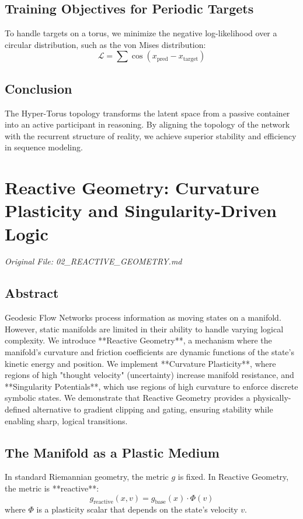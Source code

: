 \documentclass[11pt,a4paper]{report}
\begin{document}
\section{Training Objectives for Periodic Targets}
To handle targets on a torus, we minimize the negative log-likelihood over a circular distribution, such as the von Mises distribution:
\begin{equation}
    \mathcal{L} = \sum \cos(x_{\text{pred}} - x_{\text{target}})
\end{equation}

\section{Conclusion}
The Hyper-Torus topology transforms the latent space from a passive container into an active participant in reasoning. By aligning the topology of the network with the recurrent structure of reality, we achieve superior stability and efficiency in sequence modeling.

\chapter{Reactive Geometry: Curvature Plasticity and Singularity-Driven Logic}
\textit{Original File: 02\_REACTIVE\_GEOMETRY.md}

\section{Abstract}
Geodesic Flow Networks process information as moving states on a manifold. However, static manifolds are limited in their ability to handle varying logical complexity. We introduce **Reactive Geometry**, a mechanism where the manifold's curvature and friction coefficients are dynamic functions of the state's kinetic energy and position. We implement **Curvature Plasticity**, where regions of high "thought velocity" (uncertainty) increase manifold resistance, and **Singularity Potentials**, which use regions of high curvature to enforce discrete symbolic states. We demonstrate that Reactive Geometry provides a physically-defined alternative to gradient clipping and gating, ensuring stability while enabling sharp, logical transitions.

\section{The Manifold as a Plastic Medium}
In standard Riemannian geometry, the metric $g$ is fixed. In Reactive Geometry, the metric is **reactive**:
\begin{equation}
    g_{\text{reactive}}(x, v) = g_{\text{base}}(x) \cdot \Phi(v)
\end{equation}
where $\Phi$ is a plasticity scalar that depends on the state's velocity $v$.
\end{document}
